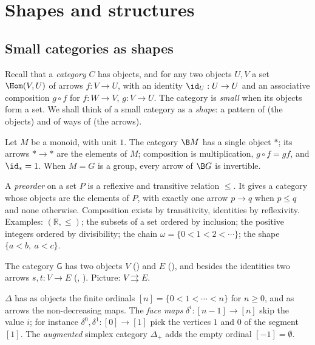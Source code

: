 \section{Shapes and structures}\label{sec:shapes}

\subsection{Small categories as shapes}

Recall that a \emph{category} $C$ has objects, and for any two objects $U,V$ a set $\Hom(V,U)$ of arrows $f : V\to U$, with an identity $\id_U : U\to U$ and an associative composition $g\circ f$ for $f : W\to V$, $g : V\to U$. The category is \emph{small} when its objects form a set. We shall think of a small category as a \emph{shape}: a pattern of  (the objects) and of ways of  (the arrows).

\begin{example}[A monoid]\label{ex:BM}
Let $M$ be a monoid, with unit $1$. The category $\B M$ has a single object $\ast$; its arrows $\ast\to\ast$ are the elements of $M$; composition is multiplication, $g\circ f = gf$, and $\id_\ast = 1$. When $M = G$ is a group, every arrow of $\B G$ is invertible.
\end{example}

\begin{example}[A preorder]\label{ex:preorder}
A \emph{preorder} on a set $P$ is a reflexive and transitive relation $\le$. It gives a category whose objects are the elements of $P$, with exactly one arrow $p\to q$ when $p\le q$ and none otherwise. Composition exists by transitivity, identities by reflexivity. Examples: $(\mathbb R,\le)$; the subsets of a set ordered by inclusion; the positive integers ordered by divisibility; the chain $\omega = \{0<1<2<\cdots\}$; the  shape $\{a<b,\ a<c\}$.
\end{example}

\begin{example}\label{ex:graphshape}
The category $\mathsf{G}$ has two objects $V$ () and $E$ (), and besides the identities two arrows $s,t : V\to E$ (, ). Picture: $V\rightrightarrows E$.
\end{example}

\begin{example}\label{ex:Delta}
$\Delta$ has as objects the finite ordinals $[n] = \{0<1<\cdots<n\}$ for $n\ge 0$, and as arrows the non-decreasing maps. The \emph{face maps} $\delta^i : [n-1]\to[n]$ skip the value $i$; for instance $\delta^0,\delta^1 : [0]\to[1]$ pick the vertices $1$ and $0$ of the segment $[1]$. The \emph{augmented} simplex category $\Delta_+$ adds the empty ordinal $[-1] = \emptyset$.
\end{example}

